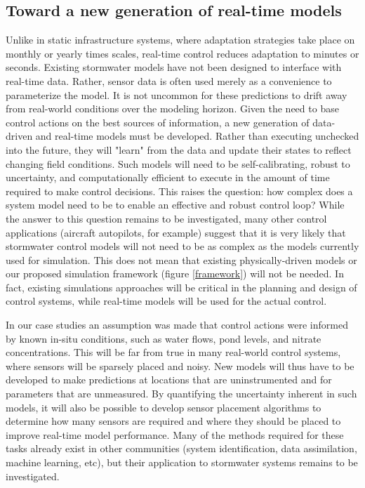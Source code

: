 \subsection{Toward a new generation of real-time models}
Unlike in static infrastructure systems, where adaptation strategies take place on monthly or yearly times scales, real-time control reduces adaptation to minutes or seconds. Existing stormwater models have not been designed to interface with real-time data. Rather, sensor data is often used merely as a convenience to parameterize the model. It is not uncommon for these predictions to drift away from real-world conditions over the modeling horizon. Given the need to base control actions on the best sources of information, a new generation of data-driven and real-time models must be developed. Rather than executing unchecked into the future, they will "learn" from the data and update their states to reflect changing field conditions. Such models will need to be self-calibrating, robust to uncertainty, and computationally efficient to execute in the amount of time required to make control decisions. This raises the question: how complex does a system model need to be to enable an effective and robust control loop? While the answer to this question remains to be investigated, many other control applications (aircraft autopilots, for example) suggest that it is very likely that stormwater control models will not need to be as complex as the models currently used for simulation. This does not mean that existing physically-driven models or our proposed simulation framework (figure \ref{framework}) will not be needed. In fact, existing simulations approaches will be critical in the planning and design of control systems, while real-time models will be used for the actual control.

In our case studies an assumption was made that control actions were informed by known in-situ conditions, such as water flows, pond levels, and nitrate concentrations. This will be far from true in many real-world control systems, where sensors will be sparsely placed and noisy. New models will thus have to be developed to make predictions at locations that are uninstrumented and for parameters that are unmeasured.  By quantifying the uncertainty inherent in such models, it will also be possible to develop sensor placement algorithms to determine how many sensors are required and where they should be placed to improve real-time model performance. Many of the methods required for these tasks already exist in other communities (system identification, data assimilation, machine learning, etc), but their application to stormwater systems remains to be investigated.



